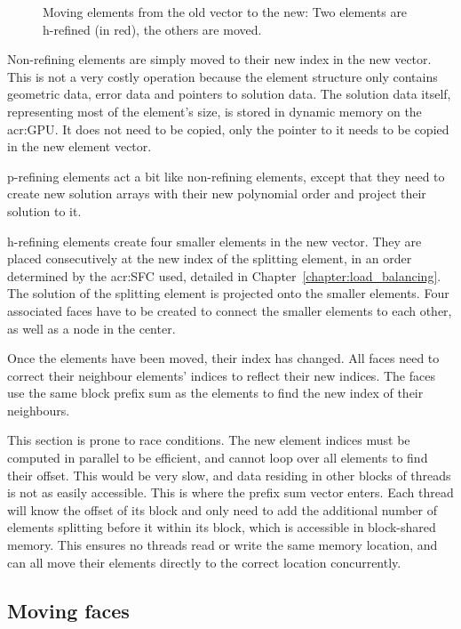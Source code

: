 \begin{figure}[H]
    \centering
    
    \caption{Moving elements from the old vector to the new: Two elements are h-refined (in red), the others are moved.}\label{fig:refinement_offset}
\end{figure}

Non-refining elements are simply moved to their new index in the new vector. This is not a very
costly operation because the element structure only contains geometric data, error data and pointers
to solution data. The solution data itself, representing most of the element's size, is stored in
dynamic memory on the \acrshort{acr:GPU}. It does not need to be copied, only the pointer to it
needs to be copied in the new element vector. 

\noindent
p-refining elements act a bit like non-refining elements, except that they need to create new
solution arrays with their new polynomial order and project their solution to it.

\noindent
h-refining elements create four smaller elements in the new vector. They are placed consecutively at
the new index of the splitting element, in an order determined by the \acrfull{acr:SFC} used,
detailed in Chapter~\ref{chapter:load_balancing}. The solution of the splitting element is projected
onto the smaller elements. Four associated faces have to be created to connect the smaller elements
to each other, as well as a node in the center. 

Once the elements have been moved, their index has changed. All faces need to correct their
neighbour elements' indices to reflect their new indices. The faces use the same block prefix sum as
the elements to find the new index of their neighbours.

This section is prone to race conditions. The new element indices must be computed in parallel to be
efficient, and cannot loop over all elements to find their offset. This would be very slow, and data
residing in other blocks of threads is not as easily accessible. This is where the prefix sum vector
enters. Each thread will know the offset of its block and only need to add the additional number of
elements splitting before it within its block, which is accessible in block-shared memory. This
ensures no threads read or write the same memory location, and can all move their elements directly
to the correct location concurrently.

\subsection{Moving faces}\label{subsection:adaptive_mesh_refinement:implementation:moving_faces}

